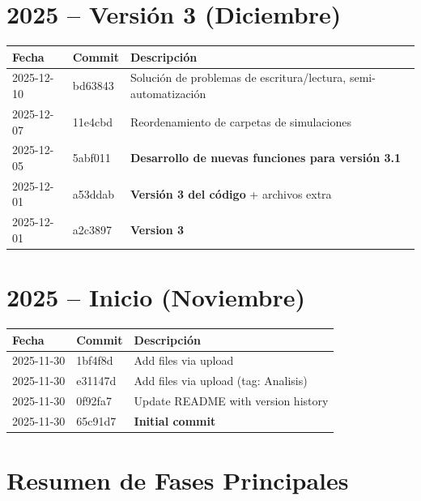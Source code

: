\documentclass[12pt,a4paper]{article}
\begin{document}
\section*{2025 -- Versión 3 (Diciembre)}

\begin{longtable}{@{}llp{10cm}@{}}
	\toprule
	\textbf{Fecha} & \textbf{Commit} & \textbf{Descripción}                                            \\
	\midrule
	2025-12-10     & bd63843         & Solución de problemas de escritura/lectura, semi-automatización \\
	2025-12-07     & 11e4cbd         & Reordenamiento de carpetas de simulaciones                      \\
	2025-12-05     & 5abf011         & \textbf{Desarrollo de nuevas funciones para versión 3.1}        \\
	2025-12-01     & a53ddab         & \textbf{Versión 3 del código} + archivos extra                  \\
	2025-12-01     & a2c3897         & \textbf{Version 3}                                              \\
	\bottomrule
\end{longtable}

\section*{2025 -- Inicio (Noviembre)}

\begin{longtable}{@{}llp{10cm}@{}}
	\toprule
	\textbf{Fecha} & \textbf{Commit} & \textbf{Descripción}                 \\
	\midrule
	2025-11-30     & 1bf4f8d         & Add files via upload                 \\
	2025-11-30     & e31147d         & Add files via upload (tag: Analisis) \\
	2025-11-30     & 0f92fa7         & Update README with version history   \\
	2025-11-30     & 65c91d7         & \textbf{Initial commit}              \\
	\bottomrule
\end{longtable}

\pagebreak

\section*{Resumen de Fases Principales}
\end{document}
